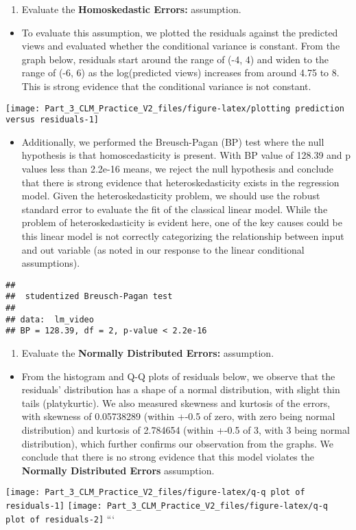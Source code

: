 \documentclass[
]{article}
\providecommand{\tightlist}{%
  \setlength{\itemsep}{0pt}\setlength{\parskip}{0pt}}
\begin{document}
\begin{enumerate}
\def\labelenumi{\arabic{enumi}.}
\setcounter{enumi}{3}
\tightlist
\item
  Evaluate the \textbf{Homoskedastic Errors:} assumption.
\end{enumerate}

\begin{itemize}
\tightlist
\item
  To evaluate this assumption, we plotted the residuals against the
  predicted views and evaluated whether the conditional variance is
  constant. From the graph below, residuals start around the range of
  (-4, 4) and widen to the range of (-6, 6) as the log(predicted views)
  increases from around 4.75 to 8. This is strong evidence that the
  conditional variance is not constant.
\end{itemize}

\texttt{[image: Part\_3\_CLM\_Practice\_V2\_files/figure-latex/plotting prediction versus residuals-1]}

\begin{itemize}
\tightlist
\item
  Additionally, we performed the Breusch-Pagan (BP) test where the null
  hypothesis is that homoscedasticity is present. With BP value of
  128.39 and p values less than 2.2e-16 means, we reject the null
  hypothesis and conclude that there is strong evidence that
  heteroskedasticity exists in the regression model. Given the
  heteroskedasticity problem, we should use the robust standard error to
  evaluate the fit of the classical linear model. While the problem of
  heteroskedasticity is evident here, one of the key causes could be
  this linear model is not correctly categorizing the relationship
  between input and out variable (as noted in our response to the linear
  conditional assumptions).
\end{itemize}

\begin{verbatim}
## 
##  studentized Breusch-Pagan test
## 
## data:  lm_video
## BP = 128.39, df = 2, p-value < 2.2e-16
\end{verbatim}

\begin{enumerate}
\def\labelenumi{\arabic{enumi}.}
\setcounter{enumi}{4}
\tightlist
\item
  Evaluate the \textbf{Normally Distributed Errors:} assumption.
\end{enumerate}

\begin{itemize}
\tightlist
\item
  From the histogram and Q-Q plots of residuals below, we observe that
  the residuals' distribution has a shape of a normal distribution, with
  slight thin tails (platykurtic). We also measured skewness and
  kurtosis of the errors, with skewness of 0.05738289 (within +-0.5 of
  zero, with zero being normal distribution) and kurtosis of 2.784654
  (within +-0.5 of 3, with 3 being normal distribution), which further
  confirms our observation from the graphs. We conclude that there is no
  strong evidence that this model violates the \textbf{Normally
  Distributed Errors} assumption.
\end{itemize}

\texttt{[image: Part\_3\_CLM\_Practice\_V2\_files/figure-latex/q-q plot of residuals-1]}
\texttt{[image: Part\_3\_CLM\_Practice\_V2\_files/figure-latex/q-q plot of residuals-2]}
```
\end{document}
